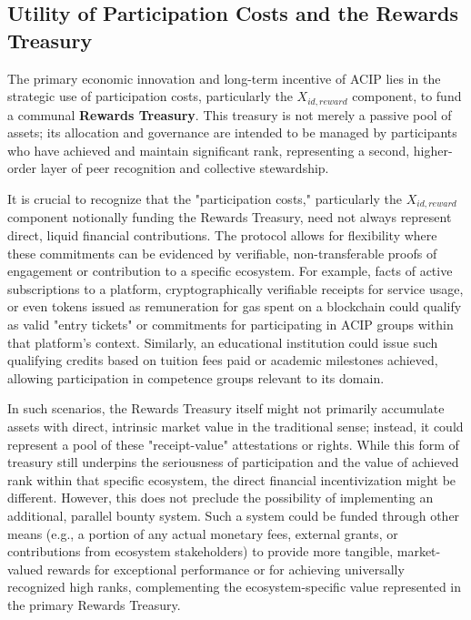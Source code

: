 \documentclass{article}
\begin{document}
\begin{CJK}{UTF8}{gbsn}
        \subsection*{Utility of Participation Costs and the Rewards Treasury}\label{sec:utility_and_treasury}
        The primary economic innovation and long-term incentive of ACIP lies in the strategic use of participation costs, particularly the $X_{id,reward}$ component, to fund a communal \textbf{Rewards Treasury}. This treasury is not merely a passive pool of assets; its allocation and governance are intended to be managed by participants who have achieved and maintain significant rank, representing a second, higher-order layer of peer recognition and collective stewardship.

        It is crucial to recognize that the "participation costs," particularly the $X_{id,reward}$ component notionally funding the Rewards Treasury, need not always represent direct, liquid financial contributions. The protocol allows for flexibility where these commitments can be evidenced by verifiable, non-transferable proofs of engagement or contribution to a specific ecosystem. For example, facts of active subscriptions to a platform, cryptographically verifiable receipts for service usage, or even tokens issued as remuneration for gas spent on a blockchain could qualify as valid "entry tickets" or commitments for participating in ACIP groups within that platform's context. Similarly, an educational institution could issue such qualifying credits based on tuition fees paid or academic milestones achieved, allowing participation in competence groups relevant to its domain.

        In such scenarios, the Rewards Treasury itself might not primarily accumulate assets with direct, intrinsic market value in the traditional sense; instead, it could represent a pool of these "receipt-value" attestations or rights. While this form of treasury still underpins the seriousness of participation and the value of achieved rank within that specific ecosystem, the direct financial incentivization might be different. However, this does not preclude the possibility of implementing an additional, parallel bounty system. Such a system could be funded through other means (e.g., a portion of any actual monetary fees, external grants, or contributions from ecosystem stakeholders) to provide more tangible, market-valued rewards for exceptional performance or for achieving universally recognized high ranks, complementing the ecosystem-specific value represented in the primary Rewards Treasury.




\end{CJK}
\end{document}
